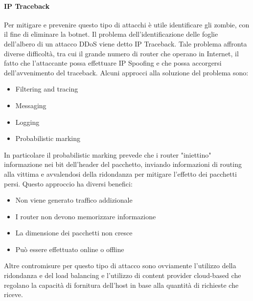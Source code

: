 \paragraph{IP Traceback}
Per mitigare e prevenire questo tipo di attacchi è utile identificare gli zombie, con il fine di eliminare la botnet. Il problema dell'identificazione delle foglie dell'albero di un attacco DDoS viene detto IP Traceback. Tale problema affronta diverse difficoltà, tra cui il grande numero di router che operano in Internet, il fatto che l'attaccante possa effettuare IP Spoofing e che possa accorgersi dell'avvenimento del traceback.
\newline \newline
Alcuni approcci alla soluzione del problema sono:
\begin{itemize}
\item Filtering and tracing 
\item Messaging 
\item Logging
\item Probabilistic marking
\end{itemize}
In particolare il probabilistic marking prevede che i router "iniettino" informazione nei bit dell'header del pacchetto, inviando informazioni di routing alla vittima e avvalendosi della ridondanza per mitigare l'effetto dei pacchetti persi. Questo approccio ha diversi benefici:
\begin{itemize}
\item Non viene generato traffico addizionale
\item I router non devono memorizzare informazione
\item La dimensione dei pacchetti non cresce
\item Può essere effettuato online o offline
\end{itemize}
Altre contromisure per questo tipo di attacco sono ovviamente l'utilizzo della ridondanza e del load balancing e l'utilizzo di content provider cloud-based che regolano la capacità di fornitura dell'host in base alla quantità di richieste che riceve.

